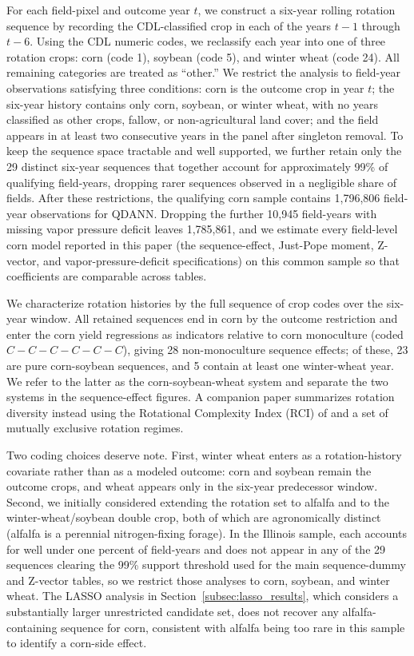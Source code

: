 \documentclass[12pt,letterpaper]{article}
\theoremstyle{remark}
\theoremstyle{remark}
\theoremstyle{plain}
\theoremstyle{definition}
\begin{document}
For each field-pixel and outcome year $t$, we construct a six-year rolling rotation sequence by recording the CDL-classified crop in each of the years $t-1$ through $t-6$. Using the CDL numeric codes, we reclassify each year into one of three rotation crops: corn (code 1), soybean (code 5), and winter wheat (code 24). All remaining categories are treated as ``other.'' We restrict the analysis to field-year observations satisfying three conditions: corn is the outcome crop in year $t$; the six-year history contains only corn, soybean, or winter wheat, with no years classified as other crops, fallow, or non-agricultural land cover; and the field appears in at least two consecutive years in the panel after singleton removal. To keep the sequence space tractable and well supported, we further retain only the 29 distinct six-year sequences that together account for approximately 99\% of qualifying field-years, dropping rarer sequences observed in a negligible share of fields. After these restrictions, the qualifying corn sample contains 1,796,806 field-year observations for QDANN. Dropping the further 10,945 field-years with missing vapor pressure deficit leaves 1,785,861, and we estimate every field-level corn model reported in this paper (the sequence-effect, Just-Pope moment, Z-vector, and vapor-pressure-deficit specifications) on this common sample so that coefficients are comparable across tables.

We characterize rotation histories by the full sequence of crop codes over the six-year window. All retained sequences end in corn by the outcome restriction and enter the corn yield regressions as indicators relative to corn monoculture (coded $C-C-C-C-C-C$), giving 28 non-monoculture sequence effects; of these, 23 are pure corn-soybean sequences, and 5 contain at least one winter-wheat year. We refer to the latter as the corn-soybean-wheat system and separate the two systems in the sequence-effect figures. A companion paper summarizes rotation diversity instead using the Rotational Complexity Index (RCI) of \citet{socolar2021} and a set of mutually exclusive rotation regimes.

Two coding choices deserve note. First, winter wheat enters as a rotation-history covariate rather than as a modeled outcome: corn and soybean remain the outcome crops, and wheat appears only in the six-year predecessor window. Second, we initially considered extending the rotation set to alfalfa and to the winter-wheat/soybean double crop, both of which are agronomically distinct (alfalfa is a perennial nitrogen-fixing forage). In the Illinois sample, each accounts for well under one percent of field-years and does not appear in any of the 29 sequences clearing the 99\% support threshold used for the main sequence-dummy and Z-vector tables, so we restrict those analyses to corn, soybean, and winter wheat. The LASSO analysis in Section~\ref{subsec:lasso_results}, which considers a substantially larger unrestricted candidate set, does not recover any alfalfa-containing sequence for corn, consistent with alfalfa being too rare in this sample to identify a corn-side effect.
\end{document}

